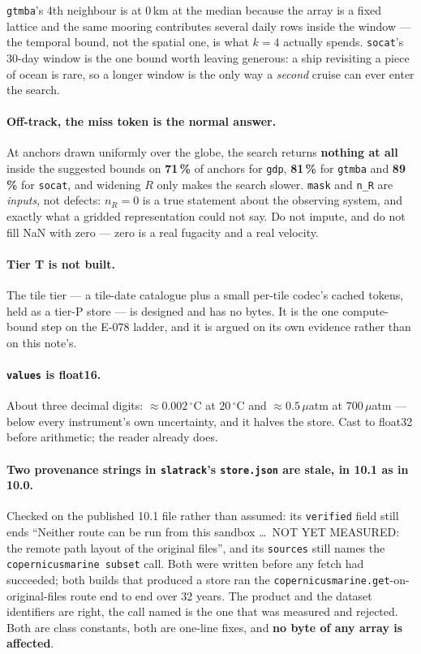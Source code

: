 \documentclass[10pt]{article}
\newcommand{\code}[1]{\texttt{#1}}
\begin{document}
\code{gtmba}'s 4th neighbour is at 0\,km at the median because the array is a
fixed lattice and the same mooring contributes several daily rows inside the
window --- the temporal bound, not the spatial one, is what $k = 4$ actually
spends. \code{socat}'s 30-day window is the one bound worth leaving generous: a
ship revisiting a piece of ocean is rare, so a longer window is the only way a
\emph{second} cruise can ever enter the search.

\paragraph{Off-track, the miss token is the normal answer.} At anchors drawn
uniformly over the globe, the search returns \textbf{nothing at all} inside the
suggested bounds on \textbf{71\,\%} of anchors for \code{gdp},
\textbf{81\,\%} for \code{gtmba} and \textbf{89\,\%} for \code{socat}, and
widening $R$ only makes the search slower. \code{mask} and \code{n\_R} are
\emph{inputs}, not defects: $n_R = 0$ is a true statement about the observing
system, and exactly what a gridded representation could not say. Do not impute,
and do not fill NaN with zero --- zero is a real fugacity and a real velocity.

\paragraph{Tier T is not built.} The tile tier --- a tile-date catalogue plus a
small per-tile codec's cached tokens, held as a tier-P store --- is designed and
has no bytes. It is the one compute-bound step on the E-078 ladder, and it is
argued on its own evidence rather than on this note's.

\paragraph{\code{values} is float16.} About three decimal digits: $\approx
0.002\,^\circ$C at $20\,^\circ$C and $\approx 0.5\,\mu$atm at
$700\,\mu$atm --- below every instrument's own uncertainty, and it halves the
store. Cast to float32 before arithmetic; the reader already does.

\paragraph{Two provenance strings in \code{slatrack}'s \code{store.json} are
stale, in 10.1 as in 10.0.} Checked on the published 10.1 file rather than
assumed: its \code{verified} field still ends ``Neither route can be run from
this sandbox \ldots\ NOT YET MEASURED: the remote path layout of the original
files'', and its \code{sources} still names the \code{copernicusmarine subset}
call. Both were written before any fetch had succeeded; both builds that
produced a store ran the \code{copernicusmarine.get}-on-original-files route
end to end over 32 years. The product and the dataset identifiers are right, the
call named is the one that was measured and rejected. Both are class constants,
both are one-line fixes, and \textbf{no byte of any array is affected}.
\end{document}
